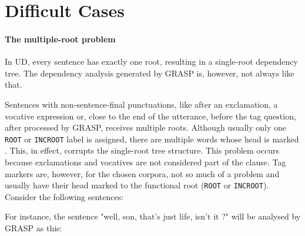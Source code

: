 
\section{Difficult Cases}
\label{sec:grdifficult}
\paragraph{The multiple-root problem}
In UD, every sentence has exactly one root, resulting in a single-root dependency tree. The dependency analysis generated by GRASP is, however, not always like that.

Sentences with non-sentence-final punctuations, like after an exclamation, a vocative expression or, close to the end of the utterance, before the tag question, after processed by GRASP, receives multiple roots. Although usually only one \texttt{ROOT} or \texttt{INCROOT} label is assigned, there are multiple words whose head is marked . This, in effect, corrupts the single-root tree structure. This problem occurs because exclamations and vocatives are not considered part of the clause. Tag markers are, however, for the chosen corpora, not so much of a problem and usually have their head marked to the functional root (\texttt{ROOT} or \texttt{INCROOT}). Consider the following sentences:


For instance, the sentence "well, son, that's just life, isn't it ?" will be analysed by GRASP as this:

